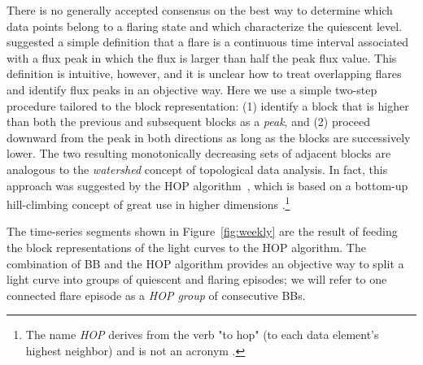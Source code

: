 \documentclass[twocolumn]{aastex62}
\begin{document}
There is no generally accepted consensus on the best way to determine which data points belong to a flaring state and which characterize the quiescent level. \citet{2013MNRAS.430.1324N} suggested a simple definition that a flare is a continuous time interval associated with a flux peak in which the flux is larger than half the peak flux value. 
This definition is intuitive, however, and it is unclear how to treat overlapping flares and identify flux peaks in an objective way. 
Here we use a simple two-step procedure tailored to the block representation: (1) identify a block that is higher than both the previous and subsequent blocks as a \textit{peak}, and (2) proceed downward from the peak in both directions as long as the blocks are successively lower.
The two resulting monotonically decreasing sets of adjacent blocks are analogous to the \textit{watershed} concept of topological data analysis.
In fact, this approach was suggested by the 
HOP algorithm~\citep{1998ApJ...498..137E}, which is based on a bottom-up hill-climbing concept of great use in higher dimensions \citep[e.g.,][]{2011ApJ...727...48W}.\footnote{The name \textit{HOP} derives from the verb "to hop" (to each data element's highest neighbor) and is not an acronym \citep{1998ApJ...498..137E}.}

The time-series segments shown in 
Figure~\ref{fig:weekly} 
are the result of feeding
the block representations of the light curves to the HOP algorithm.
The combination of BB and the HOP algorithm provides an objective way to split a light curve into groups of quiescent and flaring episodes; we will refer to one connected flare episode as a \emph{HOP group} of consecutive BBs.
\end{document}
